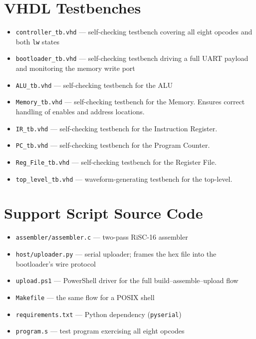 \documentclass[11pt,letterpaper]{article}
\begin{document}
\section{VHDL Testbenches}
\begin{itemize}
  \item \texttt{controller\_tb.vhd} --- self-checking testbench covering all
    eight opcodes and both \texttt{lw} states
  \item \texttt{bootloader\_tb.vhd} --- self-checking testbench driving a full
    UART payload and monitoring the memory write port
  \item \texttt{ALU\_tb.vhd} --- self-checking testbench for the ALU
  \item \texttt{Memory\_tb.vhd} --- self-checking testbench for the Memory. Ensures correct handling of enables and address locations.
  \item \texttt{IR\_tb.vhd} --- self-checking testbench for the Instruction Register.
  \item \texttt{PC\_tb.vhd} --- self-checking testbench for the Program Counter.
  \item \texttt{Reg\_File\_tb.vhd} --- self-checking testbench for the Register File.
  \item \texttt{top\_level\_tb.vhd} --- waveform-generating testbench for the top-level.
\end{itemize}

\section{Support Script Source Code}
\begin{itemize}
  \item \texttt{assembler/assembler.c} --- two-pass RiSC-16 assembler
  \item \texttt{host/uploader.py} --- serial uploader; frames the hex file into
    the bootloader's wire protocol
  \item \texttt{upload.ps1} --- PowerShell driver for the full
    build--assemble--upload flow
  \item \texttt{Makefile} --- the same flow for a POSIX shell
  \item \texttt{requirements.txt} --- Python dependency (\texttt{pyserial})
  \item \texttt{program.s} --- test program exercising all eight opcodes
\end{itemize}
\end{document}
